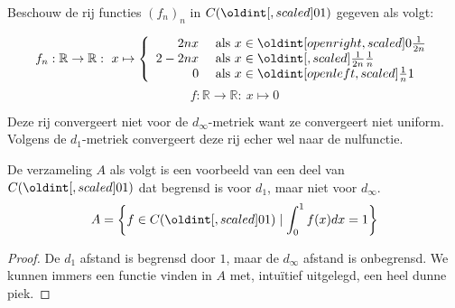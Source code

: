 \documentclass[main.tex]{subfiles}
\begin{document}
\begin{vb}
  Beschouw de rij functies $(f_{n})_{n}$ in $C(\interval{0}{1})$ gegeven als volgt:

  \noindent
  \begin{minipage}{.45\textwidth}
    \begin{figure}[H]
      \centering
    \end{figure}
  \end{minipage}
  \begin{minipage}{.45\textwidth}
  \[
  f_{n}: \mathbb{R} \rightarrow \mathbb{R}:\ x \mapsto
  \left\{
    \begin{array}{rl}
      2nx   & \text{ als } x \in \interval[open right]{0}{\frac{1}{2n}}\\
      2-2nx & \text{ als } x \in \interval{\frac{1}{2n}}{\frac{1}{n}}\\
      0     & \text{ als } x \in \interval[open left ]{\frac{1}{n}}{1}\\
    \end{array}
  \right.
  \]
  \[ f: \mathbb{R} \rightarrow \mathbb{R}:\ x \mapsto 0 \]
  \end{minipage}
  
  Deze rij convergeert niet voor de $d_{\infty}$-metriek want ze convergeert niet uniform.
  Volgens de $d_{1}$-metriek convergeert deze rij echer wel naar de nulfunctie.
\end{vb}


\begin{vb}
  De verzameling $A$ als volgt is een voorbeeld van een deel van $C(\interval{0}{1})$ dat begrensd is voor $d_{1}$, maar niet voor $d_{\infty}$.
  \[ A = \left\{ f \in C(\interval{0}{1}) \mid \int_{0}^{1}f(x)dx = 1 \right\}\]

  \begin{proof}
    De $d_{1}$ afstand is begrensd door $1$, maar de $d_{\infty}$ afstand is onbegrensd.
    We kunnen immers een functie vinden in $A$ met, intu\"itief uitgelegd, een heel dunne piek.
  \end{proof}
\end{vb}
\end{document}
